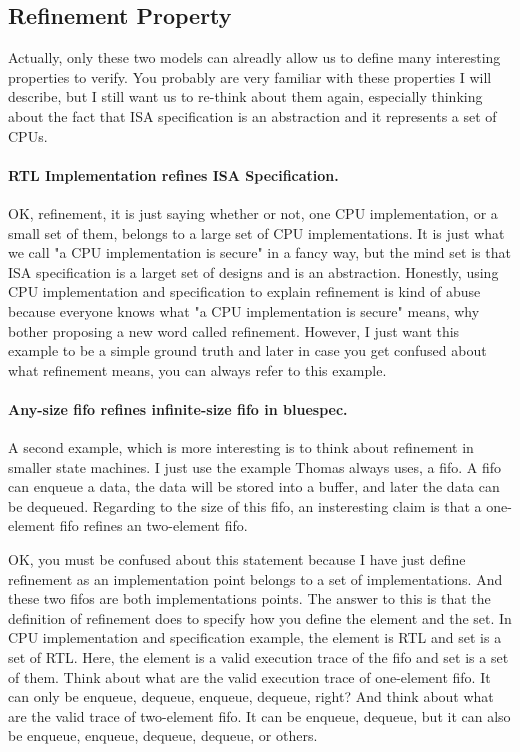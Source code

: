 \documentclass{article}
\begin{document}
\subsection{Refinement Property}

Actually, only these two models can alreadly allow us to define many interesting properties to verify.
You probably are very familiar with these properties I will describe, but I still want us to re-think about them again, especially thinking about the fact that ISA specification is an abstraction and it represents a set of CPUs.




\paragraph{RTL Implementation refines ISA Specification.}
OK, refinement, it is just saying whether or not, one CPU implementation, or a small set of them, belongs to a large set of CPU implementations.
It is just what we call "a CPU implementation is secure" in a fancy way, but the mind set is that ISA specification is a larget set of designs and is an abstraction.
Honestly, using CPU implementation and specification to explain refinement is kind of abuse because everyone knows what "a CPU implementation is secure" means, why bother proposing a new word called refinement.
However, I just want this example to be a simple ground truth and later in case you get confused about what refinement means, you can always refer to this example.




\paragraph{Any-size fifo refines infinite-size fifo in bluespec.}
A second example, which is more interesting is to think about refinement in smaller state machines.
I just use the example Thomas always uses, a fifo.
A fifo can enqueue a data, the data will be stored into a buffer, and later the data can be dequeued.
Regarding to the size of this fifo, an insteresting claim is that a one-element fifo refines an two-element fifo.

OK, you must be confused about this statement because I have just define refinement as an implementation point belongs to a set of implementations.
And these two fifos are both implementations points.
The answer to this is that the definition of refinement does to specify how you define the element and the set.
In CPU implementation and specification example, the element is RTL and set is a set of RTL.
Here, the element is a valid execution trace of the fifo and set is a set of them.
Think about what are the valid execution trace of one-element fifo.
It can only be enqueue, dequeue, enqueue, dequeue, right?
And think about what are the valid trace of two-element fifo.
It can be enqueue, dequeue, but it can also be enqueue, enqueue, dequeue, dequeue, or others.
\end{document}
